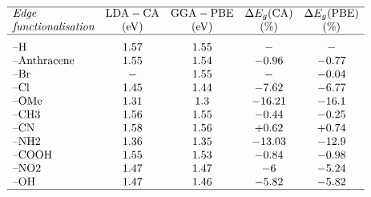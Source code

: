 \begin{table}
    \caption{\label{tab:bandgaps}
        Calculated bandgaps using different exchange--correlation implementations.}
    \[
        \begin{array}{lcccc}
            \hline\textit{Edge}        & \textrm{LDA}-\textrm{CA} & \textrm{GGA}-\textrm{PBE} & \Delta E_g \textrm{(CA)} & \Delta E_g \textrm{(PBE)}             \\
            \textit{functionalisation} & (\si{\electronvolt})     & (\si{\electronvolt})      & (\%)                     & (\%)                                  \\
            \hline
            \text{--H}                 & 1.57                     & 1.55                      & -                        & -                             \Tsmall \\
            \text{--Anthracene}        & 1.55                     & 1.54                      & -0.96                    & -0.77                                 \\
            \text{--Br}                & -                        & 1.55                      & -                        & -0.04                                 \\
            \text{--Cl}                & 1.45                     & 1.44                      & -7.62                    & -6.77                                 \\
            \text{--OMe}               & 1.31                     & 1.3                       & -16.21                   & -16.1                                 \\
            \text{--CH3}               & 1.56                     & 1.55                      & -0.44                    & -0.25                                 \\
            \text{--CN}                & 1.58                     & 1.56                      & +0.62                    & +0.74                                 \\
            \text{--NH2}               & 1.36                     & 1.35                      & -13.03                   & -12.9                                 \\
            \text{--COOH}              & 1.55                     & 1.53                      & -0.84                    & -0.98                                 \\
            \text{--NO2}               & 1.47                     & 1.47                      & -6                       & -5.24                                 \\
            \text{--OH}                & 1.47                     & 1.46                      & -5.82                    & -5.82                                 \\
            \hline
        \end{array}
    \]
\end{table}

